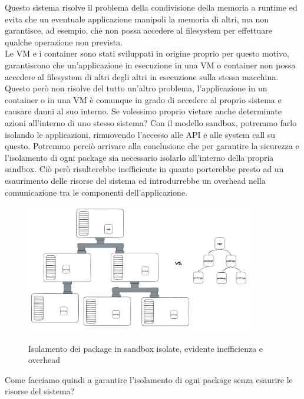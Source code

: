 Questo sistema risolve il problema della condivisione della memoria a runtime ed evita che un eventuale applicazione
manipoli la memoria di altri, ma non garantisce, ad esempio, che non possa accedere al filesystem per effettuare qualche
operazione non prevista.\\ 
Le VM e i container sono stati sviluppati in origine proprio per questo motivo, garantiscono che un'applicazione in
esecuzione in una VM o container non possa accedere al filesystem di altri degli altri in esecuzione sulla stessa
macchina. Questo però non risolve del tutto un'altro problema, l'applicazione in un container o in una VM è comunque in
grado di accedere al proprio sistema e causare danni al suo interno. Se volessimo proprio vietare anche determinate
azioni all'interno di uno stesso sistema? Con il modello sandbox, potremmo farlo isolando le applicazioni, rimuovendo
l'accesso alle API e alle system call su questo. Potremmo perciò arrivare alla conclusione che per garantire la
sicurezza e l'isolamento di ogni package sia necessario isolarlo all'interno della propria sandbox. Ciò però
risulterebbe inefficiente in quanto porterebbe presto ad un esaurimento delle risorse del sistema ed introdurrebbe un
overhead nella comunicazione tra le componenti dell'applicazione.
\begin{figure}[H]
    \centering
    \captionsetup{justification=centering}
    \includegraphics[width=10cm]{./chapters/2.wasi-in-depth/images/3.package_isolation_processes.png}
    \label{process_package_in_sandbox}
    \caption{Isolamento dei package in sandbox isolate, evidente inefficienza e overhead}
\end{figure}
Come facciamo quindi a garantire l'isolamento di ogni package senza esaurire le risorse del sistema?
